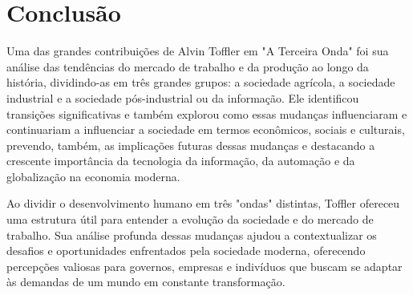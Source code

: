 \section{
    Conclusão
    }

\setlength{\parindent}{4em}
\setlength{\parskip}{0.5em}
\renewcommand{\baselinestretch}{1}

Uma das grandes contribuições de Alvin Toffler em "A Terceira Onda" foi sua análise das tendências do mercado de trabalho e da produção ao longo da história, dividindo-as em três grandes grupos: a sociedade agrícola, a sociedade industrial e a sociedade pós-industrial ou da informação. Ele identificou transições significativas e também explorou como essas mudanças influenciaram e continuariam a influenciar a sociedade em termos econômicos, sociais e culturais, prevendo, também, as implicações futuras dessas mudanças e destacando a crescente importância da tecnologia da informação, da automação e da globalização na economia moderna.

Ao dividir o desenvolvimento humano em três "ondas" distintas, Toffler ofereceu uma estrutura útil para entender a evolução da sociedade e do mercado de trabalho. Sua análise profunda dessas mudanças ajudou a contextualizar os desafios e oportunidades enfrentados pela sociedade moderna, oferecendo percepções valiosas para governos, empresas e indivíduos que buscam se adaptar às demandas de um mundo em constante transformação.